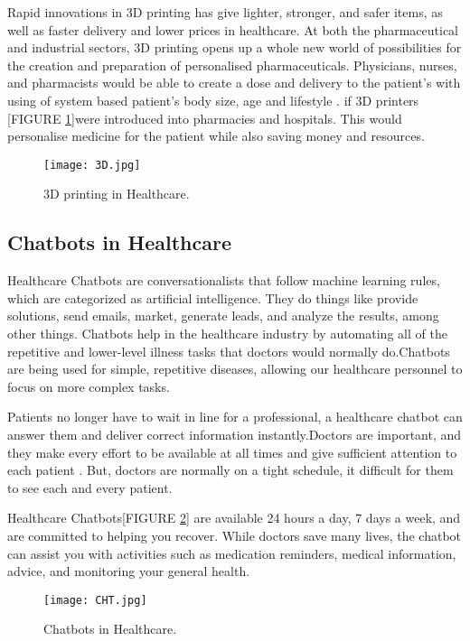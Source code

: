 \documentclass[12pt]{article}
\begin{document}
Rapid innovations in 3D printing has give  lighter, stronger, and safer items, as well as faster delivery and lower prices in healthcare.
At both the pharmaceutical and industrial sectors, 3D printing opens up a whole new world of possibilities for the creation and preparation of personalised pharmaceuticals. Physicians, nurses, and pharmacists would be able to create a dose and delivery to the patient's with using of system based patient's  body size, age and  lifestyle . if 3D printers [FIGURE \ref{fig_3D}]were introduced into pharmacies and hospitals. This would personalise medicine for the patient while also saving money and resources.
\begin{figure}[h]
\centering
\texttt{[image: 3D.jpg]}
\caption{3D printing in Healthcare.}
\label{fig_3D}
\end{figure}
\clearpage
\subsection{Chatbots in Healthcare}
Healthcare Chatbots are conversationalists that follow machine learning rules, which are categorized as artificial intelligence. They do things like provide solutions, send emails, market, generate leads, and analyze the results, among other things.
Chatbots help in the healthcare industry by automating all of the repetitive and lower-level illness tasks that doctors would normally do.Chatbots are being used for simple, repetitive diseases, allowing our healthcare personnel to focus on more complex tasks.

  Patients no longer have to wait in line  for a professional, a healthcare chatbot can answer them and deliver correct information instantly.Doctors are important, and they make every effort to be available at all times and  give sufficient attention to each  patient . But, doctors are normally on a tight schedule, it difficult for them to see each and every patient.

Healthcare Chatbots[FIGURE \ref{fig_CHT}] are available 24 hours a day, 7 days a week, and are committed to helping you recover. While doctors save many lives, the chatbot can assist you with activities such as medication reminders, medical information, advice, and monitoring your general health.
\begin{figure}[h]
\centering
\texttt{[image: CHT.jpg]}
\caption{Chatbots in Healthcare.}
\label{fig_CHT}
\end{figure}
\clearpage
\end{document}
